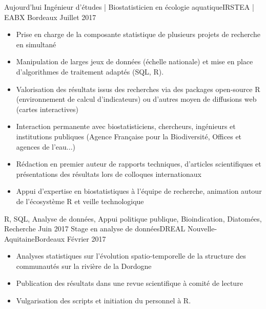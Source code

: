 \documentclass[localFont,alternative]{yaac-another-awesome-cv}
\begin{document}
\begin{experiences}
  \experience
    {Aujourd'hui}   {Ingénieur d'études | Biostatisticien en écologie aquatique}{IRSTEA | EABX }{Bordeaux}
    {Juillet 2017} {
                      \begin{itemize}                    
                        \item Prise en charge de la composante statistique de plusieurs projets de recherche en simultané
                        \item Manipulation de larges jeux de données (échelle nationale) et mise en place d'algorithmes de traitement adaptés (SQL, R).
                        \item Valorisation des résultats issus des recherches via des packages open-source R (environnement de calcul d'indicateurs) ou d'autres moyen de diffusions web (cartes interactives)
                        \item Interaction permanente avec biostatisticiens, chercheurs, ingénieurs et institutions publiques (Agence Française pour la Biodiversité, Offices et agences de l'eau...)
                        \item Rédaction en premier auteur de rapports techniques, d'articles scientifiques et présentations des résultats lors de colloques internationaux
                        \item Appui d'expertise en biostatistiques à l'équipe de recherche, animation autour de l'écosystème R et veille technologique                                                                         
                      \end{itemize}
                    }
                    {R, SQL, Analyse de données, Appui politique publique, Bioindication, Diatomées, Recherche}
  \emptySeparator
  \experience
    {Juin 2017} {Stage en analyse de données}{DREAL Nouvelle-Aquitaine}{Bordeaux}
    {Février 2017}    {
                      \begin{itemize}                 
                        \item Analyses statistiques sur l’évolution spatio-temporelle de la structure des communautés sur la rivière de la Dordogne
                        \item Publication des résultats dans une revue scientifique à comité de lecture    
                        \item Vulgarisation des scripts et initiation du personnel à R.  
                                                

\end{itemize}}
\end{experiences}
\end{document}
